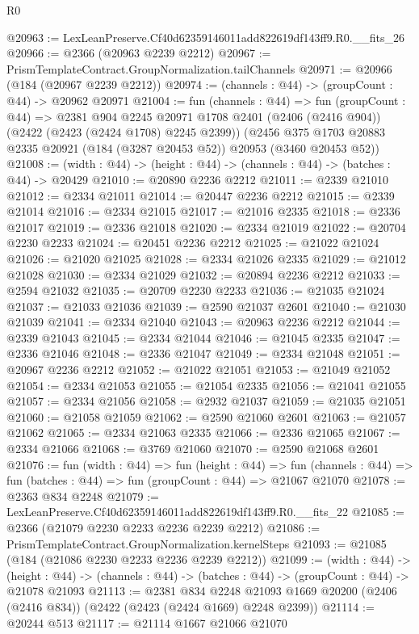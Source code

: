 \begin{lexlean}{R0}
\begin{coremodule}
@20963 := LexLeanPreserve.Cf40d62359146011add822619df143ff9.R0.__fits_26
@20966 := @2366 (@20963 @2239 @2212)
@20967 := PrismTemplateContract.GroupNormalization.tailChannels
@20971 := @20966 (@184 (@20967 @2239 @2212))
@20974 := (channels : @44) -> (groupCount : @44) -> @20962 @20971
@21004 := fun (channels : @44) =>
  fun (groupCount : @44) =>
  @2381
    @904
    @2245
    @20971
    @1708
    @2401
    (@2406 (@2416 @904))
    (@2422 (@2423 (@2424 @1708) @2245 @2399))
    (@2456 @375 @1703 @20883 @2335 @20921 (@184 (@3287 @20453 @52)) @20953 (@3460 @20453 @52))
@21008 := (width : @44) -> (height : @44) -> (channels : @44) -> (batches : @44) -> @20429
@21010 := @20890 @2236 @2212
@21011 := @2339 @21010
@21012 := @2334 @21011
@21014 := @20447 @2236 @2212
@21015 := @2339 @21014
@21016 := @2334 @21015
@21017 := @21016 @2335
@21018 := @2336 @21017
@21019 := @2336 @21018
@21020 := @2334 @21019
@21022 := @20704 @2230 @2233
@21024 := @20451 @2236 @2212
@21025 := @21022 @21024
@21026 := @21020 @21025
@21028 := @2334 @21026 @2335
@21029 := @21012 @21028
@21030 := @2334 @21029
@21032 := @20894 @2236 @2212
@21033 := @2594 @21032
@21035 := @20709 @2230 @2233
@21036 := @21035 @21024
@21037 := @21033 @21036
@21039 := @2590 @21037 @2601
@21040 := @21030 @21039
@21041 := @2334 @21040
@21043 := @20963 @2236 @2212
@21044 := @2339 @21043
@21045 := @2334 @21044
@21046 := @21045 @2335
@21047 := @2336 @21046
@21048 := @2336 @21047
@21049 := @2334 @21048
@21051 := @20967 @2236 @2212
@21052 := @21022 @21051
@21053 := @21049 @21052
@21054 := @2334 @21053
@21055 := @21054 @2335
@21056 := @21041 @21055
@21057 := @2334 @21056
@21058 := @2932 @21037
@21059 := @21035 @21051
@21060 := @21058 @21059
@21062 := @2590 @21060 @2601
@21063 := @21057 @21062
@21065 := @2334 @21063 @2335
@21066 := @2336 @21065
@21067 := @2334 @21066
@21068 := @3769 @21060
@21070 := @2590 @21068 @2601
@21076 := fun (width : @44) =>
  fun (height : @44) =>
  fun (channels : @44) => fun (batches : @44) => fun (groupCount : @44) => @21067 @21070
@21078 := @2363 @834 @2248
@21079 := LexLeanPreserve.Cf40d62359146011add822619df143ff9.R0.__fits_22
@21085 := @2366 (@21079 @2230 @2233 @2236 @2239 @2212)
@21086 := PrismTemplateContract.GroupNormalization.kernelSteps
@21093 := @21085 (@184 (@21086 @2230 @2233 @2236 @2239 @2212))
@21099 := (width : @44) ->
  (height : @44) -> (channels : @44) -> (batches : @44) -> (groupCount : @44) -> @21078 @21093
@21113 := @2381
    @834
    @2248
    @21093
    @1669
    @20200
    (@2406 (@2416 @834))
    (@2422 (@2423 (@2424 @1669) @2248 @2399))
@21114 := @20244 @513
@21117 := @21114 @1667 @21066 @21070

\end{coremodule}
\end{lexlean}
